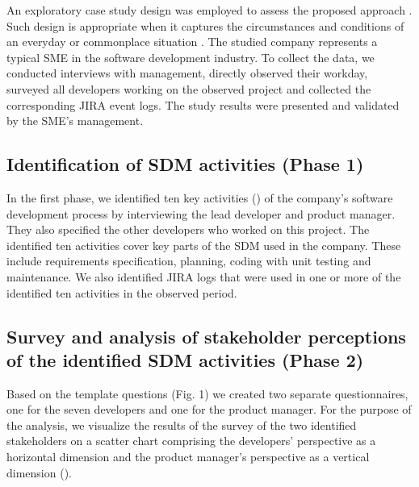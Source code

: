An exploratory case study design was employed to assess the proposed approach \citep{DBLP:journals/ese/RunesonH09}. Such design is appropriate when it captures the circumstances and conditions of an everyday or commonplace situation \citep{yin2009case}. The studied company represents a typical SME in the software development industry. To collect the data, we conducted interviews with management, directly observed their workday, surveyed all developers working on the observed project and collected the corresponding JIRA event logs. The study results were presented and validated by the SME’s management.

\subsection{Identification of SDM activities (Phase 1)}
In the first phase, we identified ten key activities () of the company’s software development process by interviewing the lead developer and product manager.  They also specified the other developers who worked on this project. The identified ten activities cover key parts of the SDM used in the company. These include requirements specification, planning, coding with unit testing and maintenance. We also identified JIRA logs that were used in one or more of the identified ten activities in the observed period.



\subsection{Survey and analysis of stakeholder perceptions of the identified SDM activities (Phase 2)}
\label{subsec:phase2}

Based on the template questions (Fig. 1) we created two separate questionnaires, one for the seven developers and one for the product manager. For the purpose of the analysis, we visualize the results of the survey of the two identified stakeholders on a scatter chart comprising the developers’ perspective as a horizontal dimension and the product manager’s perspective as a vertical dimension ().

